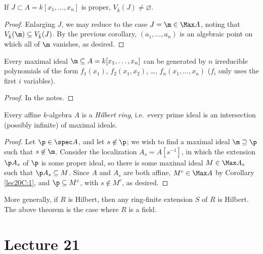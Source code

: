  \begin{corollary}
   If $J\subset A=k[x_1,\dots, x_n]$ is proper, $V_{\bar k}(J)\neq \varnothing$.
 \end{corollary}
 \begin{proof}
   Enlarging $J$, we may reduce to the case $J=\m\in \Max A$, noting that $V_{\bar
   k}(\m)\subseteq V_{\bar k}(J)$. By the previous corollary, $(a_1,\dots, a_n)$ is an
   algebraic point on which all of $\m$ vanishes, as desired.
 \end{proof}
 \begin{corollary}
   Every maximal ideal $\m\subseteq A=k[x_1,\dots, x_n]$ can be generated by $n$
   irreducible polynomials of the form $f_1(x_1)$, $f_2(x_1,x_2)$, \dots, $f_n(x_1,\dots,
   x_n)$ ($f_i$ only uses the first $i$ variables).
 \end{corollary}
 \begin{proof}
   In the notes. \anton{}
 \end{proof}
 \begin{theorem}
   Every affine $k$-algebra $A$ is a \emph{Hilbert ring}, i.e.\ every prime ideal is an
   intersection (possibly infinite) of maximal ideals.
 \end{theorem}
 \begin{proof}
   Let $\p\in \spec A$, and let $s\not\in \p$; we wish to find a maximal ideal
   $\m\supseteq \p$ such that $s\not\in \m$. Consider the localization $A_s=A[s^{-1}]$,
   in which the extension $\p A_s$ of $\p$ is some proper ideal, so there is some maximal
   ideal $M\in \Max A_s$ such that $\p A_s\subseteq M$. Since $A$ and $A_s$ are both
   affine, $M^c\in \Max A$ by Corollary \ref{lec20C:1}, and $\p\subseteq M^c$, with
   $s\not\in M^c$, as desired.
 \end{proof}
 More generally, if $R$ is Hilbert, then any ring-finite extension $S$ of $R$ is Hilbert.
 The above theorem is the case where $R$ is a field.
 \setcounter{lecture}{21}
 \section{Lecture 21}

